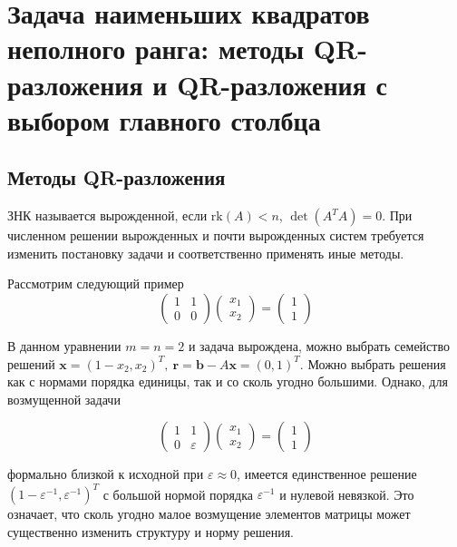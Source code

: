 \section{Задача наименьших квадратов неполного ранга: методы QR-разложения и QR-разложения с выбором главного столбца}

\subsection*{Методы QR-разложения}

ЗНК называется вырожденной, если $\text{rk}(A)<n$, $\det(A^TA)=0$. При численном решении
вырожденных и почти вырожденных систем требуется изменить постановку задачи
и соответственно применять иные методы.

\begin{remark}
  Рассмотрим следующий пример
  \[\left(\begin{array}{cc}
        1 & 1 \\
        0 & 0
      \end{array}\right)\left(\begin{array}{c}
        x_1 \\
        x_2
      \end{array}\right)=\left(\begin{array}{c}
        1 \\
        1
      \end{array}\right)\]

  В данном уравнении $m=n=2$ и задача вырождена, можно выбрать семейство решений
  $\mathbf{x}=(1-x_2,x_2)^T,\ \mathbf{r}=\mathbf{b}-A\mathbf{x}=(0,1)^T$.
  Можно выбрать решения как с нормами порядка единицы, так и со сколь угодно большими.
  Однако, для возмущенной задачи

  \[\left(\begin{array}{cc}
        1 & 1           \\
        0 & \varepsilon
      \end{array}\right)\left(\begin{array}{c}
        x_1 \\
        x_2
      \end{array}\right)=\left(\begin{array}{c}
        1 \\
        1
      \end{array}\right)\]

  формально близкой к исходной при $\varepsilon\approx 0$, имеется
  единственное решение $(1-\varepsilon^{-1},\varepsilon^{-1})^T$ с большой
  нормой порядка $\varepsilon^{-1}$ и нулевой невязкой. Это
  означает, что сколь угодно малое возмущение элементов матрицы может
  существенно изменить структуру и норму решения.
\end{remark}

